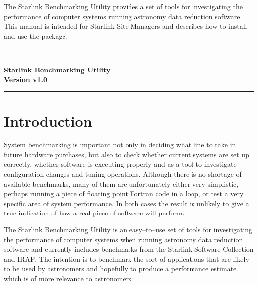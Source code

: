 \documentclass[11pt]{article}
\newcommand{\stardocinitials}  {SSN}
\newcommand{\stardocnumber}    {23.3}
\newcommand{\stardoctitle}     {Starlink Benchmarking Utility}
\newcommand{\stardocabstract}  {The Starlink Benchmarking Utility provides a
set of tools for investigating the performance of computer systems running
astronomy data reduction software. This manual is intended for Starlink Site Managers and describes how to install and use the package.}
\newcommand{\stardocversion}   {Version \pkgver}
\newcommand{\stardocname}{\stardocinitials /\stardocnumber}
\newenvironment{latexonly}{}{}
\renewcommand{\thepage}{\roman{page}}
\newcommand{\pkgver}     {v1.0}
\renewcommand{\thepage}{\roman{page}}
\begin{document}
\stardocabstract
\newpage
\begin{latexonly}
  \begin {center}
    \rule{80mm}{0.5mm} \\ [1ex]
    {\Large\bf \stardoctitle \\ [2.5ex]
            \stardocversion} \\ [2ex]
     \rule{80mm}{0.5mm}
  \end{center}
  \vspace{20mm}
  \setlength{\parskip}{0mm}
  \tableofcontents
  \setlength{\parskip}{\medskipamount}
  \markright{\stardocname}
\end{latexonly}
\newpage
\renewcommand{\thepage}{\arabic{page}}
\setcounter{page}{1}


\newpage
\renewcommand{\thepage}{\arabic{page}}
\setcounter{page}{1}
\vspace{30mm}
\section{Introduction}

System benchmarking is important not only in deciding what line to take
in future hardware purchases, but also to check whether current systems are
set up correctly, whether software is executing properly and as a tool to
investigate configuration changes and tuning operations. Although there is
no shortage of available benchmarks, many of them are unfortunately either
very simplistic, perhaps running a piece of floating point Fortran code in a loop, or test a very specific area of system performance. In both cases the
result is unlikely to give a true indication of how a real piece of software
will perform.

The Starlink Benchmarking Utility is an easy--to--use set of
tools for investigating the performance of computer systems when
running astronomy data reduction software and currently includes
benchmarks from the Starlink Software Collection and IRAF. The
intention is to benchmark the sort of applications that are likely to
be used by astronomers and hopefully to produce a performance estimate
which is of more relevance to astronomers.
\end{document}
